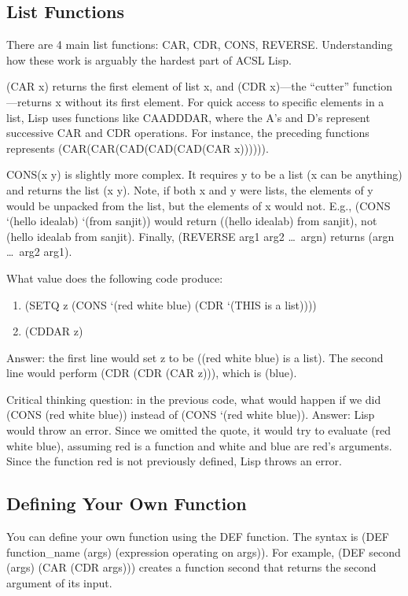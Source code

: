 \documentclass{pset_template}
\begin{document}
\subsection{List Functions}
There are 4 main list functions: CAR, CDR, CONS, REVERSE.
Understanding how these work is arguably the hardest part of ACSL Lisp.

(CAR x) returns the first element of list x, and (CDR x)---the ``cutter'' function---returns
x without its first element.
For quick access to specific elements in a list, Lisp
uses functions like CAADDDAR, where the A's and D's represent successive
CAR and CDR operations.
For instance, the preceding functions represents (CAR(CAR(CAD(CAD(CAD(CAR x)))))).

CONS(x y) is slightly more complex.
It requires y to be a list (x can be anything) and returns the list (x y).
Note, if both x and y were lists, the elements of y would be unpacked from
the list, but the elements of x would not.
E.g., (CONS `(hello idealab) `(from sanjit)) would return ((hello idealab) from sanjit),
not (hello idealab from sanjit).
Finally, (REVERSE arg1 arg2 \ldots~argn) returns (argn \ldots~arg2 arg1).

What value does the following code produce:
\begin{enumerate}
    \item (SETQ z (CONS `(red white blue) (CDR `(THIS is a list))))
    \item (CDDAR z)
\end{enumerate}
Answer: the first line would set z to be ((red white blue) is a list).
The second line would perform (CDR (CDR (CAR z))), which is (blue).

Critical thinking question: in the previous code, what would
happen if we did (CONS (red white blue)) instead of (CONS `(red white blue)).
Answer: Lisp would throw an error.
Since we omitted the quote, it would try to evaluate (red white blue),
assuming red is a function and white and blue are red's arguments.
Since the function red is not previously defined, Lisp throws an error.

\subsection{Defining Your Own Function}
You can define your own function using the DEF function.
The syntax is (DEF function\_name (args) (expression operating on args)).
For example, (DEF second (args) (CAR (CDR args))) creates
a function second that returns the second argument of its input.
\end{document}
